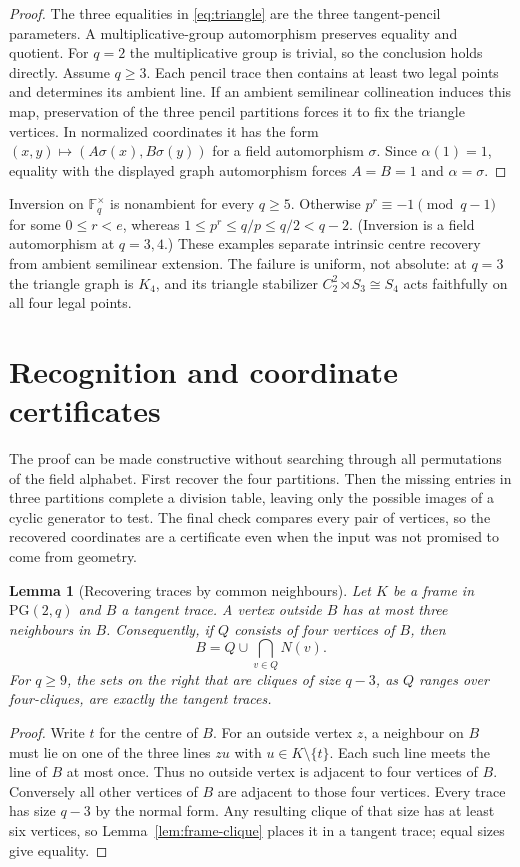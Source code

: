 \documentclass[11pt]{article}
\newtheorem{lemma}[theorem]{Lemma}
\theoremstyle{definition}
\theoremstyle{remark}
\newcommand{\F}{\mathbb F}
\newcommand{\PG}{\mathrm{PG}}
\begin{document}
\begin{proof}
The three equalities in \eqref{eq:triangle} are the three tangent-pencil parameters.  A
multiplicative-group automorphism preserves equality and quotient. For $q=2$
the multiplicative group is trivial, so the conclusion holds directly.
Assume $q\ge3$. Each pencil trace then contains at least two legal points
and determines its ambient line. If an
ambient semilinear collineation induces this map, preservation of the three
pencil partitions forces it to fix the triangle vertices.  In normalized
coordinates it has the form
$(x,y)\mapsto(A\sigma(x),B\sigma(y))$ for a field automorphism $\sigma$.
Since $\alpha(1)=1$, equality with the displayed graph automorphism forces
$A=B=1$ and $\alpha=\sigma$.
\end{proof}

Inversion on $\F_q^\times$ is nonambient for every $q\ge5$.
Otherwise $p^r\equiv-1\pmod{q-1}$ for some $0\le r<e$, whereas
$1\le p^r\le q/p\le q/2<q-2$. (Inversion is a field automorphism
at $q=3,4$.) These examples separate
intrinsic centre recovery from ambient semilinear extension. The failure
is uniform, not absolute: at $q=3$ the triangle graph is $K_4$, and its
triangle stabilizer $C_2^2\rtimes S_3\cong S_4$ acts faithfully on all four
legal points.

\section{Recognition and coordinate certificates}\label{sec:algorithm}

The proof can be made constructive without searching through all
permutations of the field alphabet. First recover the four partitions.
Then the missing entries in three partitions complete a division table, leaving
only the possible images of a cyclic generator to test. The final check
compares every pair of vertices, so the recovered coordinates are a
certificate even when the input was not promised to come from geometry.

\begin{lemma}[Recovering traces by common neighbours]\label{lem:seeds}
Let $K$ be a frame in $\PG(2,q)$ and $B$ a tangent trace. A vertex outside
$B$ has at most three neighbours in $B$. Consequently, if $Q$ consists
of four vertices of $B$, then
\[
 B=Q\cup\bigcap_{v\in Q}N(v).
\]
For $q\ge9$, the sets on the right that are cliques of size $q-3$,
as $Q$ ranges over four-cliques, are exactly the tangent traces.
\end{lemma}
\begin{proof}
Write $t$ for the centre of $B$. For an outside vertex $z$, a neighbour
on $B$ must lie on one of the three lines $zu$ with $u\in K\setminus\{t\}$.
Each such line meets the line of $B$ at most once. Thus no outside vertex
is adjacent to four vertices of $B$. Conversely all other vertices of
$B$ are adjacent to those four vertices. Every trace has size $q-3$ by
the normal form. Any resulting clique of that size has at least six
vertices, so Lemma~\ref{lem:frame-clique} places it in a tangent trace; equal
sizes give equality.
\end{proof}
\end{document}
